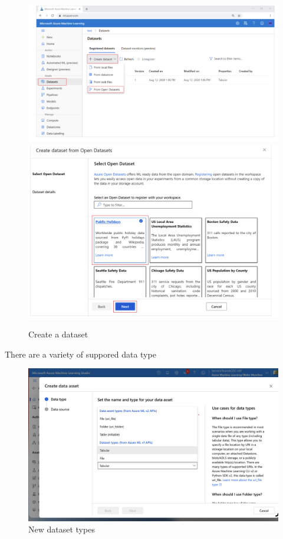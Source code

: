 \begin{figure}[H]
	\centering
	\includegraphics[scale = 0.2]{attachment/chapter_10/Scc006}\\ 
		\includegraphics[scale = 0.2]{attachment/chapter_10/Scc007}
	\caption{Create a dataset}
\end{figure}

There are a variety of suppored data type 

\begin{figure}[H]
	\centering
	\includegraphics[scale = 0.1]{attachment/chapter_10/Scc008}
	\caption{New dataset types}
\end{figure}

